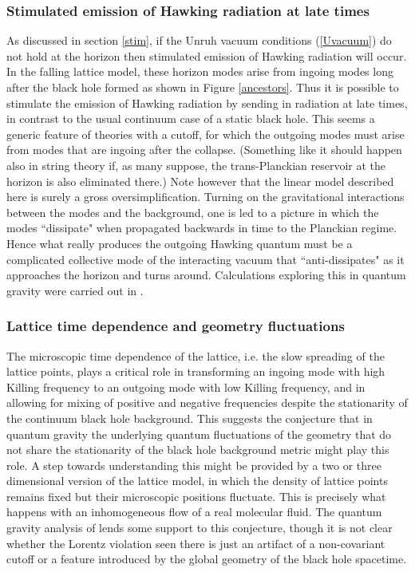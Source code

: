 \documentclass[12pt]{article}
\begin{document}
\subsubsection{Stimulated emission of Hawking radiation
at late times}\label{latestim}
As  discussed in section  \ref{stim},
if the Unruh vacuum conditions (\ref{Uvacuum}) do not 
hold at the horizon then stimulated emission of Hawking 
radiation will occur. In the falling lattice model, these 
horizon modes arise from ingoing modes long after the black
hole formed as shown in Figure \ref{ancestors}. 
Thus it is possible to stimulate the emission of 
Hawking radiation by sending in radiation at late times, in contrast to the
usual continuum case of a static black hole.
This seems a generic feature of theories with a cutoff,
for which the outgoing modes must arise from modes
that are ingoing after the collapse.
(Something like it should happen also in string theory
if, as many suppose, the trans-Planckian reservoir at the horizon is 
also eliminated there.) Note however that the linear model
described here is surely a gross oversimplification. Turning
on the gravitational interactions between the modes and the 
background, one is led to a picture in which the modes
``dissipate" when propagated backwards in time to the
Planckian regime. Hence what really produces the outgoing 
Hawking quantum must be a complicated collective mode
of the interacting vacuum that ``anti-dissipates" as it approaches
the horizon and turns around. Calculations exploring this in 
quantum gravity were carried out in \cite{collective}.


\subsubsection{Lattice time dependence and geometry fluctuations}
\label{latticetimedep}
The microscopic time dependence of the lattice, i.e. the slow 
spreading of the lattice points, plays a critical
role in transforming an ingoing mode with high Killing frequency to 
an outgoing mode with low Killing frequency, and 
in allowing for mixing of positive and negative frequencies
despite the stationarity of the continuum black hole background.
This suggests the conjecture that in 
quantum gravity the underlying quantum fluctuations of the 
geometry that do not share the stationarity of the black hole
background metric might play this role. A step towards understanding
this might be provided by a two or three dimensional version
of the lattice model, in which the density of lattice points remains
fixed but their microscopic positions fluctuate. This is precisely
what happens with an inhomogeneous flow of a real molecular fluid.
The quantum gravity analysis of  \cite{collective} lends some support
to this conjecture, though it is not clear whether the Lorentz violation
seen there is just an artifact of a non-covariant cutoff or a feature
introduced by the global geometry  of the black hole spacetime.
\end{document}

